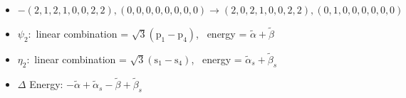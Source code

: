 \documentclass[12pt,a4paper]{article}
\begin{document}
        \begin{itemize}
            \item $- (2, 1, 2, 1, 0, 0, 2, 2), (0, 0, 0, 0, 0, 0, 0, 0) \rightarrow (2, 0, 2, 1, 0, 0, 2, 2), (0, 1, 0, 0, 0, 0, 0, 0)$
        
            \item $\psi_{2}:$ linear combination = $\sqrt{3} \left(\text{p}_{1} - \text{p}_{4}\right)$, \
            energy = $\tilde{\alpha} + \tilde{\beta}$
            
            \item $\eta_{2}:$ linear combination = $\sqrt{3} \left(\text{s}_{1} - \text{s}_{4}\right)$, \
            energy = $\tilde{\alpha}_{s} + \tilde{\beta}_{s}$
            
                \item $\Delta$ Energy: $- \tilde{\alpha} + \tilde{\alpha}_{s} - \tilde{\beta} + \tilde{\beta}_{s}$

\end{itemize}
\end{document}
